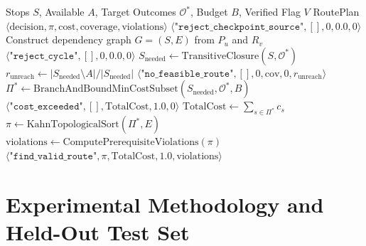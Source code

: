 \documentclass[11pt,a4paper]{article}
\begin{document}
\begin{algorithm}[ht]
\caption{Cognitively Constrained Heritage Trail Planner ($I_1$)}
\label{alg:cognitive_planner}
\begin{algorithmic}[1]
\REQUIRE Stops $S$, Available $A$, Target Outcomes $\mathcal{O}^*$, Budget $B$, Verified Flag $V$
\ENSURE RoutePlan $\langle \text{decision}, \pi, \text{cost}, \text{coverage}, \text{violations} \rangle$
    \RETURN $\langle \texttt{"reject\_checkpoint\_source"}, [], 0, 0.0, 0 \rangle$
\ENDIF
\STATE Construct dependency graph $G = (S, E)$ from $P_u$ and $R_v$
    \RETURN $\langle \texttt{"reject\_cycle"}, [], 0, 0.0, 0 \rangle$
\ENDIF
\STATE $S_{\text{needed}} \leftarrow \text{TransitiveClosure}(S, \mathcal{O}^*)$
    \STATE $r_{\text{unreach}} \leftarrow |S_{\text{needed}} \setminus A| / |S_{\text{needed}}|$
    \RETURN $\langle \texttt{"no\_feasible\_route"}, [], 0, \text{cov}, 0, r_{\text{unreach}} \rangle$
\ENDIF
\STATE $\Pi^* \leftarrow \text{BranchAndBoundMinCostSubset}(S_{\text{needed}}, \mathcal{O}^*, B)$
\IF{$\Pi^* = \emptyset$}
    \RETURN $\langle \texttt{"cost\_exceeded"}, [], \text{TotalCost}, 1.0, 0 \rangle$
\ENDIF
\STATE $\text{TotalCost} \leftarrow \sum_{s \in \Pi^*} c_s$
\STATE $\pi \leftarrow \text{KahnTopologicalSort}(\Pi^*, E)$
\STATE $\text{violations} \leftarrow \text{ComputePrerequisiteViolations}(\pi)$
\RETURN $\langle \texttt{"find\_valid\_route"}, \pi, \text{TotalCost}, 1.0, \text{violations} \rangle$
\end{algorithmic}
\end{algorithm}

\section{Experimental Methodology and Held-Out Test Set}\label{sec:holdout}
\end{document}
